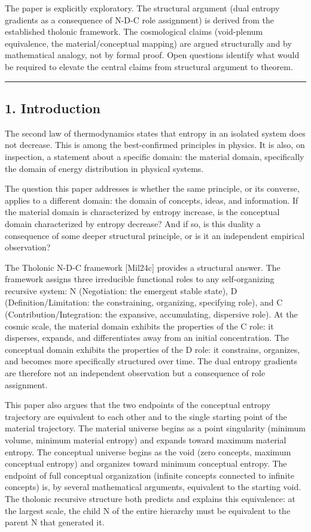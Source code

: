 \documentclass[
  11pt,
  letterpaper,
]{article}
\begin{document}
The paper is explicitly exploratory. The structural argument (dual
entropy gradients as a consequence of N-D-C role assignment) is derived
from the established tholonic framework. The cosmological claims
(void-plenum equivalence, the material/conceptual mapping) are argued
structurally and by mathematical analogy, not by formal proof. Open
questions identify what would be required to elevate the central claims
from structural argument to theorem.

\begin{center}\rule{0.5\linewidth}{0.5pt}\end{center}

\subsection{1. Introduction}\label{introduction}

The second law of thermodynamics states that entropy in an isolated
system does not decrease. This is among the best-confirmed principles in
physics. It is also, on inspection, a statement about a specific domain:
the material domain, specifically the domain of energy distribution in
physical systems.

The question this paper addresses is whether the same principle, or its
converse, applies to a different domain: the domain of concepts, ideas,
and information. If the material domain is characterized by entropy
increase, is the conceptual domain characterized by entropy decrease?
And if so, is this duality a consequence of some deeper structural
principle, or is it an independent empirical observation?

The Tholonic N-D-C framework {[}Mil24c{]} provides a structural answer.
The framework assigns three irreducible functional roles to any
self-organizing recursive system: N (Negotiation: the emergent stable
state), D (Definition/Limitation: the constraining, organizing,
specifying role), and C (Contribution/Integration: the expansive,
accumulating, dispersive role). At the cosmic scale, the material domain
exhibits the properties of the C role: it disperses, expands, and
differentiates away from an initial concentration. The conceptual domain
exhibits the properties of the D role: it constrains, organizes, and
becomes more specifically structured over time. The dual entropy
gradients are therefore not an independent observation but a consequence
of role assignment.

This paper also argues that the two endpoints of the conceptual entropy
trajectory are equivalent to each other and to the single starting point
of the material trajectory. The material universe begins as a point
singularity (minimum volume, minimum material entropy) and expands
toward maximum material entropy. The conceptual universe begins as the
void (zero concepts, maximum conceptual entropy) and organizes toward
minimum conceptual entropy. The endpoint of full conceptual organization
(infinite concepts connected to infinite concepts) is, by several
mathematical arguments, equivalent to the starting void. The tholonic
recursive structure both predicts and explains this equivalence: at the
largest scale, the child N of the entire hierarchy must be equivalent to
the parent N that generated it.
\end{document}
